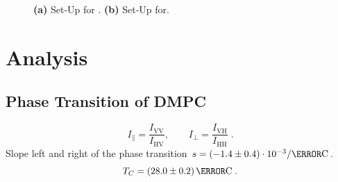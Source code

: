 \documentclass{scrartcl}
\numberwithin{equation}{section}
\numberwithin{figure}{section}
\numberwithin{table}{section}
\newcommand{\eq}[2]{\begin{equation}#1\label{#2}\end{equation}}
\begin{document}
\begin{figure}
\centering
{}
\hfill
{}
\caption{ \small \textbf{(a)} Set-Up for . \textbf{(b)} Set-Up for.}
\label{fig:setup}
\end{figure}

\clearpage

\section{Analysis}

\subsection{Phase Transition of DMPC}

\eq{I_\parallel = \frac{I_\text{VV}}{I_\text{HV}} , \qquad I_\perp = \frac{I_\text{VH}}{I_\text{HH}} \; . }{idef}
Slope left and right of the phase transition $s = (-1.4 \pm 0.4 ) \cdot 10^{-3} / \degree \text{C}$.
\eq{ T_C = ( 28.0 \pm 0.2 ) \, \degree \text{C} \; .}{Tc}
\end{document}
